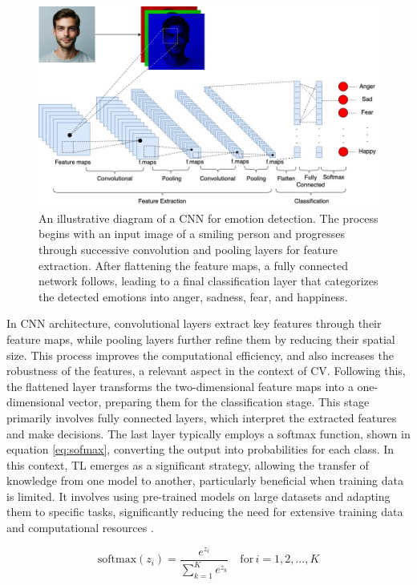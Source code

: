 \documentclass[runningheads]{llncs}
\begin{document}
\begin{figure}[htb]
\centering
\includegraphics[width=0.97\linewidth]{CNNArchitecture.jpg}
\caption{An illustrative diagram of a CNN for emotion detection. The process begins with an input image of a smiling person and progresses through successive convolution and pooling layers for feature extraction. After flattening the feature maps, a fully connected network follows, leading to a final classification layer that categorizes the detected emotions into anger, sadness, fear, and happiness.}
\label{fig:cnnarchitecture}
\end{figure}

In CNN architecture, convolutional layers extract key features through their feature maps, while pooling layers further refine them by reducing their spatial size. This process improves the computational efficiency, and also increases the robustness of the features, a relevant aspect in the context of CV. Following this, the flattened layer transforms the two-dimensional feature maps into a one-dimensional vector, preparing them for the classification stage. This stage primarily involves fully connected layers, which interpret the extracted features and make decisions. The last layer typically employs a softmax function, shown in equation \ref{eq:sofmax}, converting the output into probabilities for each class. In this context, TL emerges as a significant strategy, allowing the transfer of knowledge from one model to another, particularly beneficial when training data is limited. It involves using pre-trained models on large datasets and adapting them to specific tasks, significantly reducing the need for extensive training data and computational resources \cite{Khan2020}.

\begin{equation}
\text{softmax}(z_i) = \frac{e^{z_i}}{\sum_{k=1}^{K} e^{z_k}} \quad \text{for} \, i = 1, 2, ..., K
\label{eq:sofmax}
\end{equation}
\end{document}
